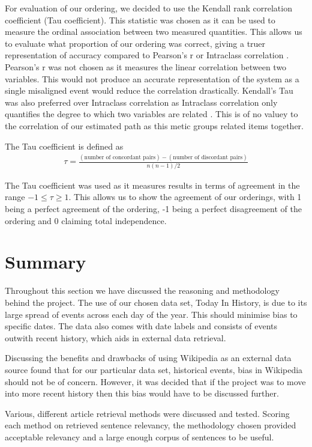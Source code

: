 \documentclass[bsc,frontabs,twoside,singlespacing,parskip,deptreport]{infthesis}     %
\begin{document}
For evaluation of our ordering, we decided to use the Kendall rank correlation coefficient (Tau coefficient).
This statistic was chosen as it can be used to measure the ordinal association between two measured quantities.
This allows us to evaluate what proportion of our ordering was correct, giving a truer representation of accuracy
compared to Pearson's r or Intraclass correlation \cite{}.
Pearson's r was not chosen as it measures the linear correlation between two variables\cite{}.
This would not produce an accurate representation of the system as a single misaligned event would reduce the
correlation drastically.
Kendall's Tau was also preferred over Intraclass correlation as Intraclass correlation only quantifies the
degree to which two variables are related \cite{}. This is of no valuey to the correlation of our estimated path
as this metic groups related items together.


The Tau coefficient is defined as
\begin{eqnarray}
  \tau=\frac{(\text{number of concordant pairs})-(\text{number of discordant pairs})}{n(n-1)/2}\nonumber
\end{eqnarray}\cite{abdi2007kendall}

The Tau coefficient was used as it measures results in terms of agreement in the range $-1 \leq \tau \geq 1$.
This allows us to show the agreement of our orderings, with 1 being a perfect agreement of the ordering, -1 being a perfect disagreement of the ordering and 0 claiming
total independence.


\section{Summary}
Throughout this section we have discussed the reasoning and methodology behind the project.
The use of our chosen data set, Today In History, is due to its large spread of events across
each day of the year. This should minimise bias to specific dates. The data also comes with date labels and
consists of events outwith recent history, which aids in external data retrieval.

Discussing the benefits and drawbacks of using Wikipedia as an external data source found that
for our particular data set, historical events, bias in Wikipedia should not be of concern.
However, it was decided that if the project was to move into more recent history then this bias would
have to be discussed further.

Various, different article retrieval methods were discussed and tested.
Scoring each method on retrieved sentence relevancy, the methodology chosen provided acceptable relevancy
and a large enough corpus of sentences to be useful.
\end{document}
